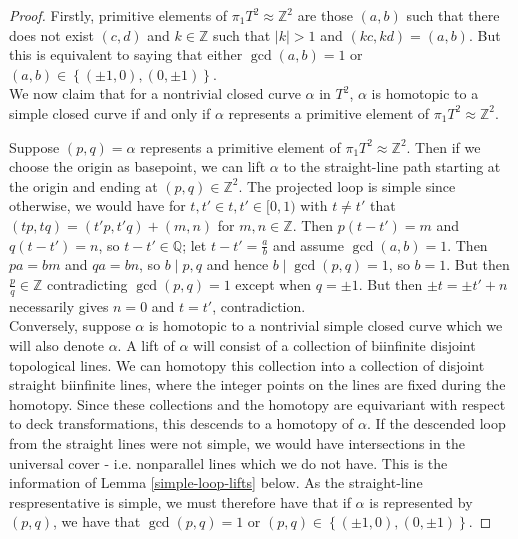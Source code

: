 \documentclass[reqno]{amsart}
\theoremstyle{definition}
\theoremstyle{remark}
\begin{document}
\begin{proof}
    Firstly, primitive elements
    of $\pi_1 T^2 \approx \mathbb{Z}^2$ are those
    $\left( a,b \right) $ such that there
    does not exist $(c,d)$ and $k \in \mathbb{Z}$ such that
    $\left| k \right| >1$ and $\left( kc,kd \right) =
    \left( a,b \right) $. But this is equivalent to saying that
    either $\gcd (a,b) = 1$ or $\left( a,b \right) 
    \in \left\{ \left( \pm 1,0 \right) ,
    \left( 0, \pm 1 \right) \right\} $.\\
    
    We now claim that for a nontrivial closed curve $\alpha$ in $T^2$,
    $\alpha$ is homotopic to a simple closed curve if and only
    if $\alpha$ represents a primitive element of
    $\pi_1 T^2 \approx \mathbb{Z}^2$.

    Suppose $ (p,q) = \alpha$ represents a primitive element of
    $\pi_1 T^2 \approx \mathbb{Z}^2$. Then if we choose
    the origin as basepoint, we can lift  $\alpha$ to
    the straight-line path starting at the origin and 
    ending at $\left( p,q \right)  \in \mathbb{Z}^2$. 
    The projected loop is simple since otherwise,
    we would have for $t,t' \in t,t' \in [0,1) $ with
    $t \neq t'$ that
    $\left( tp,tq \right) = \left( t'p,t'q \right) +
    \left( m,n \right) $ for $m,n \in \mathbb{Z}$.
    Then $p \left( t-t' \right) = m$ and
    $q \left( t-t' \right) = n$, so
    $t-t' \in \mathbb{Q}$; let $t-t' = \frac{a}{b}$ and
    assume $\gcd \left( a,b \right) = 1$. Then
    $pa = bm$ and $qa = bn$, so
    $b  \mid p,q$ and hence $b  \mid \gcd(p,q) = 1$, so
    $b = 1$.
    But then $\frac{p}{q} \in \mathbb{Z}$ contradicting
    $\gcd \left( p,q \right) = 1$ except when
    $q = \pm 1$. But then $\pm t = \pm t' + n$ necessarily
    gives $n = 0$ and $t = t'$, contradiction.\\
    \linebreak
    Conversely, suppose $\alpha$ is homotopic to
    a nontrivial simple closed curve which we will also
    denote $\alpha$. A lift of $\alpha$ will consist
    of a collection of biinfinite disjoint topological lines.
    We can homotopy this collection into a collection of disjoint
    straight biinfinite lines, where the integer points on
    the lines are fixed during the homotopy. 
    Since these collections and the homotopy are equivariant
    with respect to deck transformations, this descends
    to a homotopy of $\alpha$. If the descended loop
    from the straight lines were not simple, we would
    have intersections in the universal cover - i.e. nonparallel
    lines which we do not have. This is the information of
    Lemma \ref{simple-loop-lifts} below.
    As the straight-line respresentative is simple, we
    must therefore have that if $\alpha$ is represented by
    $\left( p,q \right) $, we have that
    $ \gcd \left( p,q \right) = 1$ or
    $\left( p,q \right) \in \left\{ \left( \pm 1,0 \right) ,
    \left( 0, \pm 1 \right) \right\} $.


\end{proof}
\end{document}
